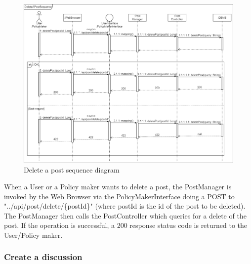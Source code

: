 \begin{figure}[h!]
        \centering
        \includegraphics[scale=0.30]{images/runtime_view/delete_post_runtime_view_diagram.png}
        \caption{Delete a post sequence diagram}
        \label{fig:delete_a_post_sequence_diagram}
\end{figure}
\FloatBarrier

When a User or a Policy maker wants to delete a post, the PostManager is invoked by the Web Browser via the PolicyMakerInterface doing a POST to "../api/post/delete/\{postId\}" (where postId is the id of the post to be deleted). \\
The PostManager then calls the PostController which queries for a delete of the post. If the operation is successful, a 200 response status code is returned to the User/Policy maker.

\newpage
\subsubsection{Create a discussion}

